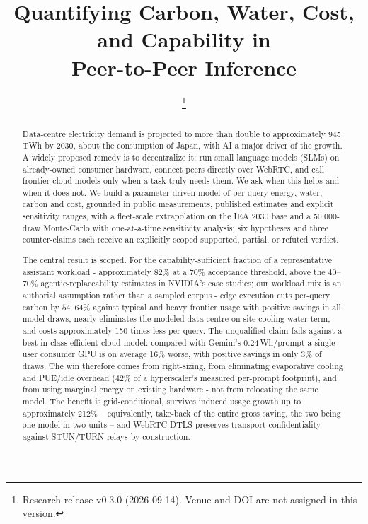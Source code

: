 \documentclass[conference]{IEEEtran}
\begin{document}
\title{Quantifying Carbon, Water, Cost, and Capability in\\
Peer-to-Peer Inference}

\author{
\thanks{Research release v0.3.0 (2026-09-14). Venue and DOI are not assigned in this version.}}

\maketitle

\begin{abstract}
Data-centre electricity demand is projected to more than double to
approximately 945\,TWh by 2030, about the consumption of Japan, with AI a major
driver of the growth. A widely proposed remedy is to decentralize it: run small
language models (SLMs) on already-owned consumer hardware, connect peers
directly over WebRTC, and call frontier cloud models only when a task truly
needs them. We ask when this helps and when it does not. We build a
parameter-driven model of per-query energy, water, carbon and cost, grounded in
public measurements, published estimates and explicit sensitivity ranges, with a
fleet-scale extrapolation on the IEA 2030 base and a 50{,}000-draw Monte-Carlo
with one-at-a-time sensitivity analysis; six hypotheses and three counter-claims
each receive an explicitly scoped supported, partial, or refuted verdict.

The central result is scoped. For the capability-sufficient fraction of a
representative assistant workload - approximately 82\% at a 70\% acceptance
threshold, above the 40--70\% agentic-replaceability estimates in NVIDIA's case
studies; our workload mix is an authorial assumption rather than a sampled
corpus - edge execution cuts per-query carbon by $54$--$64\%$ against typical and
heavy frontier usage with positive savings in all model draws, nearly
eliminates the modeled data-centre on-site cooling-water term, and costs
approximately 150 times less per
query. The unqualified claim fails against a best-in-class efficient cloud
model: compared with Gemini's 0.24\,Wh/prompt a single-user consumer GPU is on
average 16\% worse, with positive savings in only 3\% of draws. The win
therefore comes from right-sizing, from eliminating evaporative cooling and
PUE/idle overhead ($42\%$ of a hyperscaler's measured per-prompt footprint), and
from using marginal energy on existing hardware - not from relocating the same
model. The benefit is grid-conditional, survives induced usage growth up to
approximately 212\% -- equivalently, take-back of the entire gross saving, the
two being one model in two units -- and WebRTC DTLS preserves transport
confidentiality against
STUN/TURN relays by construction.


\end{abstract}
\end{document}
